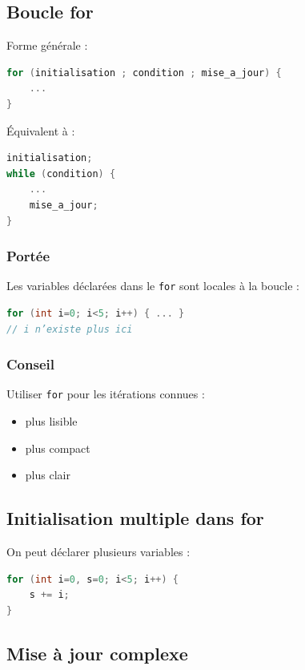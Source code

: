 \subsection{Boucle for}

Forme générale :

\begin{lstlisting}[language=C]
for (initialisation ; condition ; mise_a_jour) {
    ...
}
\end{lstlisting}

Équivalent à :

\begin{lstlisting}[language=C]
initialisation;
while (condition) {
    ...
    mise_a_jour;
}
\end{lstlisting}

\subsubsection{Portée}

Les variables déclarées dans le \texttt{for} sont locales à la boucle :

\begin{lstlisting}[language=C]
for (int i=0; i<5; i++) { ... }
// i n’existe plus ici
\end{lstlisting}

\subsubsection{Conseil}

Utiliser \texttt{for} pour les itérations connues :

\begin{itemize}
    \item plus lisible
    \item plus compact
    \item plus clair
\end{itemize}

\subsection{Initialisation multiple dans for}

On peut déclarer plusieurs variables :

\begin{lstlisting}[language=C]
for (int i=0, s=0; i<5; i++) {
    s += i;
}
\end{lstlisting}

\subsection{Mise à jour complexe}

